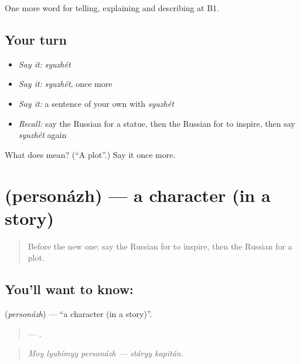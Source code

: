 \begin{grammarlens}[title={What you've built}]
One more word for telling, explaining and describing at B1.
\end{grammarlens}

\subsection*{Your turn}
\begin{itemize}
\raggedright
  \item \emph{Say it:} \emph{syuzhét}
  \item \emph{Say it:} \emph{syuzhét}, once more
  \item \emph{Say it:} a sentence of your own with \emph{syuzhét}
  \item \emph{Recall:} say the Russian for a statue, then the Russian for to inspire, then say \emph{syuzhét} again
\end{itemize}

\begin{tcolorbox}[breakable,colback=teal!4,colframe=teal!35!black,title={Before you move on}]
What does  mean? (\textquotedblleft{}A plot\textquotedblright{}.) Say it once more.
\end{tcolorbox}
\section[\texorpdfstring{\ru{персонаж} (personázh)}{персонаж (personázh)}]{ (personázh) — a character (in a story)}

\label{lesson:RU-C523-personazh}



\begin{quote}
Before the new one: say the Russian for to inspire, then the Russian for a plot.
\end{quote}

\subsection*{You'll want to know: }
\textbf{} (\emph{personázh}) — \textquotedblleft{}a character (in a story)\textquotedblright{}.

\begin{quote}
   —  .
\end{quote}

\begin{quote}
\emph{Moy lyubímyy personázh — stáryy kapitán.}
\end{quote}

